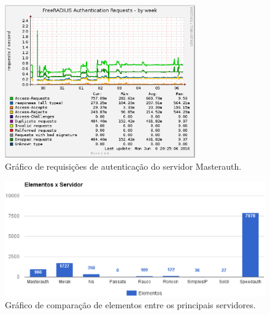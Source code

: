 \begin{itemize}
\begin{figure}[h!]
 \centering
 \includegraphics[width=310px]{img/masterauth_auth_week.eps}
 \caption{Gráfico de requisições de autenticação do servidor Masterauth.}
 \label{fig:masterauth_auth_week}
\end{figure}

\begin{figure}[h!]
 \centering
 \includegraphics[width=430px]{img/servico_elemento.eps}
 \caption{Gráfico de comparação de elementos entre os principais servidores.}
 \label{fig:servico_elemento}
\end{figure}


\end{itemize}
